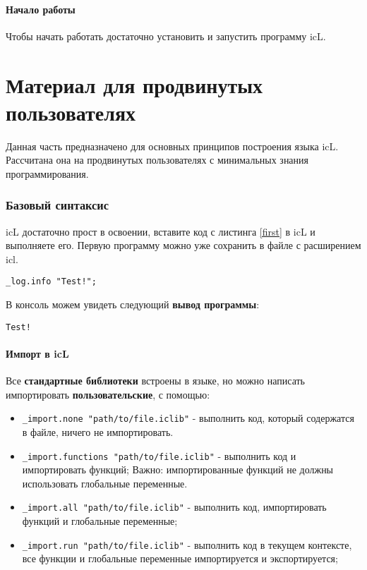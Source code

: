 \documentclass[a4paper, 14pt]{extarticle}
\newenvironment{icItems}
	{ \begin{itemize} [noitemsep,nolistsep] }
	{ \end{itemize} }
\begin{document}
\subsection{Начало работы}

Чтобы начать работать достаточно установить и запустить программу icL.

\newpage
\part{Материал для продвинутых пользователях}

Данная часть предназначено для основных принципов построения языка icL. Рассчитана она на продвинутых пользователях с минимальных знания программирования.

\section{Базовый синтаксис}

icL достаточно прост в освоении, вставите код с листинга \ref{first} в icL и выполняете его. Первую программу можно уже сохранить в файле с расширением icl.

\begin{lstlisting}[caption=Первая программа, label=first]
_log.info "Test!";
\end{lstlisting}

В консоль можем увидеть следующий \textbf{вывод программы}:

\begin{lstlisting}[numbers=none]
Test!
\end{lstlisting}

\subsection{Импорт в icL}

Все \textbf{стандартные библиотеки} встроены в языке, но можно написать импортировать \textbf{пользовательские}, с помощью:

\begin{icItems}
\item
	\lstinline|_import.none "path/to/file.iclib"| - выполнить код, который содержатся в файле, ничего не импортировать.
\item
	\lstinline|_import.functions "path/to/file.iclib"| - выполнить код и импортировать функций; {\color{red}Важно:} импортированные функций не должны использовать глобальные переменные.
\item
	\lstinline|_import.all "path/to/file.iclib"| -  выполнить код, импортировать функций и глобальные переменные;
\item
	\lstinline|_import.run "path/to/file.iclib"| - выполнить код в текущем контексте, все функции и глобальные переменные импортируется и экспортируется;
\end{icItems}
\end{document}
